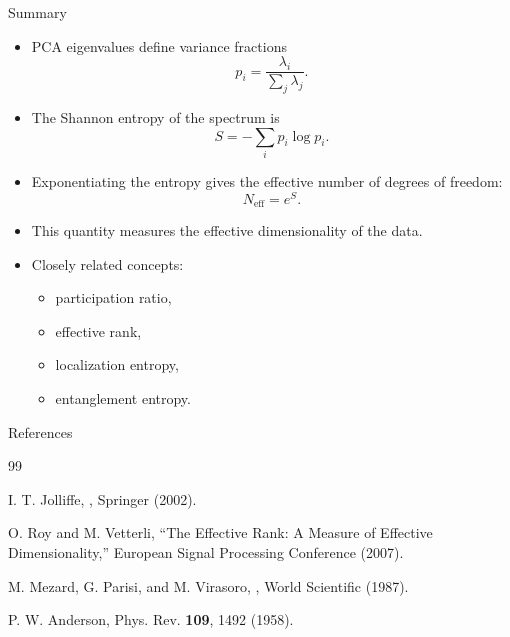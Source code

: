 \documentclass{beamer}
\begin{document}
\begin{frame}{Summary}

\begin{itemize}
    \item PCA eigenvalues define variance fractions
    \[
    p_i=\frac{\lambda_i}{\sum_j\lambda_j}.
    \]
    
    \item The Shannon entropy of the spectrum is
    \[
    S=-\sum_i p_i\log p_i.
    \]
    
    \item Exponentiating the entropy gives the effective number of degrees of freedom:
    \[
    N_{\mathrm{eff}}=e^S.
    \]
    
    \item This quantity measures the effective dimensionality of the data.
    
    \item Closely related concepts:
    \begin{itemize}
        \item participation ratio,
        \item effective rank,
        \item localization entropy,
        \item entanglement entropy.
    \end{itemize}
\end{itemize}

\end{frame}

\begin{frame}{References}

\footnotesize

\begin{thebibliography}{99}

I. T. Jolliffe,
,
Springer (2002).

\vspace{0.2cm}

O. Roy and M. Vetterli,
\newblock ``The Effective Rank: A Measure of Effective Dimensionality,''
European Signal Processing Conference (2007).

\vspace{0.2cm}

M. Mezard, G. Parisi, and M. Virasoro,
,
World Scientific (1987).

\vspace{0.2cm}

P. W. Anderson,
\newblock Phys. Rev. {\bf 109}, 1492 (1958).

\end{thebibliography}

\end{frame}

\end{document}
